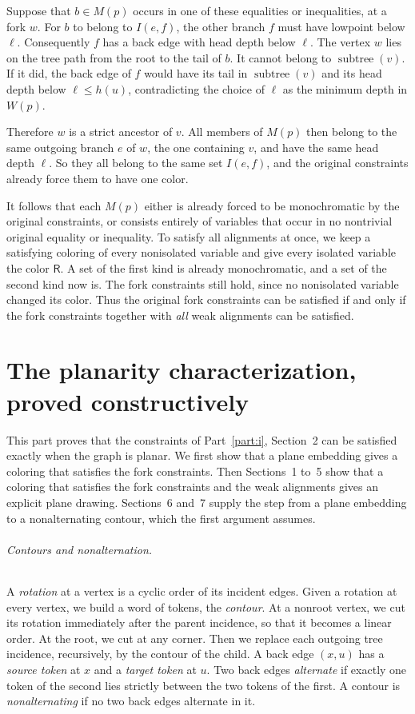 \documentclass[11pt]{article}
\DeclareMathOperator{\subtree}{subtree}
\newcommand{\cR}{\mathsf{R}}
\begin{document}
Suppose that $b\in M(p)$ occurs in one of these equalities or inequalities, at
a fork $w$. For $b$ to belong to $I(e,f)$, the other branch $f$ must have
lowpoint below $\ell$. Consequently $f$ has a back edge with head depth below
$\ell$. The vertex $w$ lies on the tree path from the root to the tail of $b$.
It cannot belong to $\subtree(v)$. If it did, the back edge of $f$ would have
its tail in $\subtree(v)$ and its head depth below $\ell\le h(u)$,
contradicting the choice of $\ell$ as the minimum depth in $W(p)$.

Therefore $w$ is a strict ancestor of $v$. All members of $M(p)$ then belong to
the same outgoing branch $e$ of $w$, the one containing $v$, and have the same
head depth $\ell$. So they all belong to the same set $I(e,f)$, and the
original constraints already force them to have one color.

It follows that each $M(p)$ either is already forced to be monochromatic by
the original constraints, or consists entirely of variables that occur in no
nontrivial original equality or inequality. To satisfy all alignments at once,
we keep a satisfying coloring of every nonisolated variable and give every
isolated variable the color $\cR$. A set of the first kind is already
monochromatic, and a set of the second kind now is. The fork constraints still
hold, since no nonisolated variable changed its color. Thus the original fork constraints can be satisfied if
and only if the fork constraints together with \emph{all} weak alignments can
be satisfied.

\part{The planarity characterization, proved constructively}\label{part:iv}

This part proves that the constraints of Part~\ref{part:i}, Section~2 can be
satisfied exactly when the graph is planar. We first show that a plane
embedding gives a coloring that satisfies the fork constraints. Then
Sections~1 to~5 show that a coloring that satisfies the fork constraints and
the weak alignments gives an explicit plane drawing. Sections~6 and~7 supply
the step from a plane embedding to a nonalternating contour, which the first
argument assumes.

\paragraph{Contours and nonalternation.}
A \emph{rotation} at a vertex is a cyclic order of its incident edges. Given a
rotation at every vertex, we build a word of tokens, the \emph{contour}. At a
nonroot vertex, we cut its rotation immediately after the parent incidence, so
that it becomes a linear order. At the root, we cut at any corner. Then we
replace each outgoing tree incidence, recursively, by the contour of the child.
A back edge $(x,u)$ has a \emph{source token} at $x$ and a \emph{target token}
at $u$. Two back edges \emph{alternate} if exactly one token of the second lies
strictly between the two tokens of the first. A contour is
\emph{nonalternating} if no two back edges alternate in it.
\end{document}
